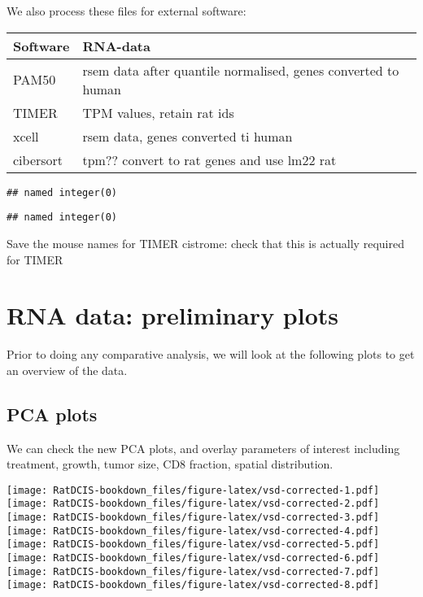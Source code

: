 \documentclass[
]{book}
\begin{document}
We also process these files for external software:

\begin{longtable}[]{@{}ll@{}}
\toprule
Software & RNA-data\tabularnewline
\midrule
\endhead
PAM50 & rsem data after quantile normalised, genes converted to human\tabularnewline
TIMER & TPM values, retain rat ids\tabularnewline
xcell & rsem data, genes converted ti human\tabularnewline
cibersort & tpm?? convert to rat genes and use lm22 rat\tabularnewline
\bottomrule
\end{longtable}

\begin{verbatim}
## named integer(0)
\end{verbatim}

\begin{verbatim}
## named integer(0)
\end{verbatim}

Save the mouse names for TIMER cistrome: check that this is actually required for TIMER

\hypertarget{rna-data-preliminary-plots}{%
\chapter{RNA data: preliminary plots}\label{rna-data-preliminary-plots}}

Prior to doing any comparative analysis, we will look at the following plots to get an overview of the data.

\hypertarget{pca-plots}{%
\section{PCA plots}\label{pca-plots}}

We can check the new PCA plots, and overlay parameters of interest including treatment, growth, tumor size, CD8 fraction, spatial distribution.

\texttt{[image: RatDCIS-bookdown\_files/figure-latex/vsd-corrected-1.pdf]} \texttt{[image: RatDCIS-bookdown\_files/figure-latex/vsd-corrected-2.pdf]} \texttt{[image: RatDCIS-bookdown\_files/figure-latex/vsd-corrected-3.pdf]} \texttt{[image: RatDCIS-bookdown\_files/figure-latex/vsd-corrected-4.pdf]} \texttt{[image: RatDCIS-bookdown\_files/figure-latex/vsd-corrected-5.pdf]} \texttt{[image: RatDCIS-bookdown\_files/figure-latex/vsd-corrected-6.pdf]} \texttt{[image: RatDCIS-bookdown\_files/figure-latex/vsd-corrected-7.pdf]} \texttt{[image: RatDCIS-bookdown\_files/figure-latex/vsd-corrected-8.pdf]}
\end{document}
